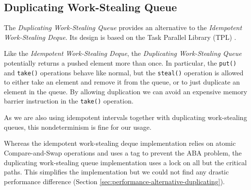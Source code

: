 \subsection{Duplicating Work-Stealing Queue}
\label{sec:queues-alternative-implementations-duplicating-queue}

The \emph{Duplicating Work-Stealing Queue} provides an alternative to
the \emph{Idempotent Work-Stealing Deque}. Its design is based on the
Task Parallel Library (TPL) \cite{Leijen2009}.

Like the \emph{Idempotent Work-Stealing Deque}, the \emph{Duplicating
  Work-Stealing Queue} potentially returns a pushed element more than
once. In particular, the \lstinline!put()!  and \lstinline!take()!
operations behave like normal, but the \lstinline!steal()! operation
is allowed to either take an element and remove it from the queue, or
to just duplicate an element in the queue. By allowing duplication we
can avoid an expensive memory barrier instruction in the
\lstinline!take()! operation.

As we are also using idempotent intervals together with duplicating
work-stealing queues, this nondeterminism is fine for our usage.

Whereas the idempotent work-stealing deque implementation relies on
atomic Compare-and-Swap operations and uses a tag to prevent the ABA
problem, the duplicating work-stealing queue implementation uses a
lock on all but the critical paths. This simplifies the implementation
but we could not find any drastic performance difference (Section
\ref{sec:performance-alternative-duplicating}).


